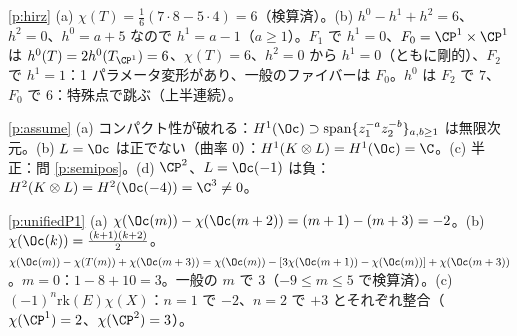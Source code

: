 \begin{sol}{\ref{p:hirz}}
(a) $\chi(T)=\frac16(7\cdot8-5\cdot4)=6$（検算済）。(b) $h^0-h^1+h^2=6$、$h^2=0$、$h^0=a+5$ なので $h^1=a-1$（$a\ge1$）。$F_1$ で $h^1=0$、$F_0=\CP^1\times\CP^1$ は $h^0(T)=2h^0(T_{\CP^1})=6$、$\chi(T)=6$、$h^2=0$ から $h^1=0$（ともに剛的）、$F_2$ で $h^1=1$：1 パラメータ変形があり、一般のファイバーは $F_0$。$h^0$ は $F_2$ で $7$、$F_0$ で $6$：特殊点で跳ぶ（上半連続）。
\end{sol}
\begin{sol}{\ref{p:assume}}
(a) コンパクト性が破れる：$H^1(\Oc)\supset\mathrm{span}\{z_1^{-a}z_2^{-b}\}_{a,b\ge1}$ は無限次元。(b) $L=\Oc$ は正でない（曲率 $0$）：$H^1(K\otimes L)=H^1(\Oc)=\C$。(c) 半正：問 \ref{p:semipos}。(d) $\CP^2$、$L=\Oc(-1)$ は負：$H^2(K\otimes L)=H^2(\Oc(-4))=\C^3\ne0$。
\end{sol}
\begin{sol}{\ref{p:unifiedP1}}
(a) $\chi(\Oc(m))-\chi(\Oc(m+2))=(m+1)-(m+3)=-2$。(b) $\chi(\Oc(k))=\frac{(k+1)(k+2)}2$。$\chi(\Oc(m))-\chi(T(m))+\chi(\Oc(m+3))=\chi(\Oc(m))-[3\chi(\Oc(m+1))-\chi(\Oc(m))]+\chi(\Oc(m+3))$。$m=0$：$1-8+10=3$。一般の $m$ で $3$（$-9\le m\le5$ で検算済）。(c) $(-1)^n\mathrm{rk}(E)\chi(X)$：$n=1$ で $-2$、$n=2$ で $+3$ とそれぞれ整合（$\chi(\CP^1)=2$、$\chi(\CP^2)=3$）。

\end{sol}
